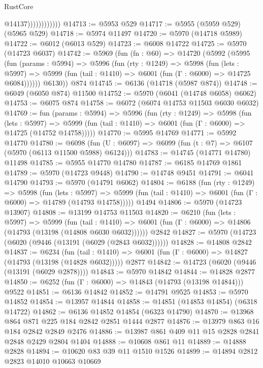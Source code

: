 \begin{lexlean}{RustCore}
\begin{coremodule}
{\begin{coremodule}
{{{{{{{{{{{{{{{{{{{{{{{{{{{{{{{{{{{{{{{{{{{{{                            @14137))))))))))))
@14713 := @5953 @529
@14717 := @5955 (@5959 @529) (@5965 @529)
@14718 := @5974 @11497
@14720 := @5970 (@14718 @5989)
@14722 := @6012 (@6013 @529)
@14723 := @6008 @14722
@14725 := @5970 (@14723 @6037)
@14742 := @5969
    (fun (fn : @60) =>
    @14720
      (@5992
        (@5995
          (fun (params : @5994) =>
          @5996
            (fun (rty : @1249) =>
            @5998
              (fun (lets : @5997) =>
              @5999 (fun (tail : @1410) => @6001 (fun (Γ : @6000) => @14725 @6084))))))
        @6130))
    @874
@14745 := @6136 (@14718 (@5987 @874))
@14748 := @6049 (@6050 @874) @11500
@14752 := @5970 (@6041 (@14748 @6058) @6062)
@14753 := @6075 @874
@14758 := @6072 (@6074 @14753 @11503 @6030 @6032)
@14769 := fun (params : @5994) =>
  @5996
    (fun (rty : @1249) =>
    @5998
      (fun (lets : @5997) =>
      @5999 (fun (tail : @1410) => @6001 (fun (Γ : @6000) => @14725 (@14752 @14758)))))
@14770 := @5995 @14769
@14771 := @5992 @14770
@14780 := @6098
    (fun (U : @6097) => @6099 (fun (t : @7) => @6107 (@5970 (@6113 @11500 @5988) @6124)))
@14783 := @14745 (@14771 @14780) @11498
@14785 := @5955 @14770 @14780
@14787 := @6185 @14769 @1861
@14789 := @5970 (@14723 @9448)
@14790 := @14748 @9451
@14791 := @6041 @14790
@14793 := @5970 (@14791 @6062)
@14804 := @6188
    (fun (rty : @1249) =>
    @5998
      (fun (lets : @5997) =>
      @5999 (fun (tail : @1410) => @6001 (fun (Γ : @6000) => @14789 (@14793 @14758)))))
    @1494
@14806 := @5970 (@14723 @13907)
@14808 := @13199 @14753 @11503
@14820 := @6210
    (fun (lets : @5997) =>
    @5999
      (fun (tail : @1410) =>
      @6001 (fun (Γ : @6000) => @14806 (@14793 (@13198 (@14808 @6030 @6032))))))
    @2842
@14827 := @5970 (@14723 (@6020 (@9446 (@13191 (@6029 (@2843 @6032))))))
@14828 := @14808 @2842
@14837 := @6234
    (fun (tail : @1410) => @6001 (fun (Γ : @6000) => @14827 (@14793 (@13198 (@14828 @6032)))))
    @2877
@14842 := @14723 (@6020 (@9446 (@13191 (@6029 @2878))))
@14843 := @5970 @14842
@14844 := @14828 @2877
@14850 := @6252 (fun (Γ : @6000) => @14843 (@14793 (@13198 @14844))) @9522
@14851 := @6136 @14842
@14852 := @14791 @9525
@14853 := @5970 @14852
@14854 := @13957 @14844
@14858 := @14851 (@14853 @14854) (@6318 @14722)
@14862 := @6136 @14852 @14854 (@6323 @14790)
@14870 := @13968 @864 @871 @225 @184 @2842 @2851 @1444 @2877
@14876 := @13979 @863 @16 @184 @2842 @2849 @2476
@14886 := @13987 @861 @409 @11 @15 @2828 @2841 @2848 @2429 @2804 @1404
@14888 := @10608 @861 @11
@14889 := @14888 @2828
@14894 := @10620 @83 @39 @11 @1510 @1526
@14899 := @14894 @2812 @2823 @14010 @10663 @10669
}}}}}}}}}}}}}}}}}}}}}}}}}}}}}}}}}}}}}}}}}}}}}
\end{coremodule}}
\end{coremodule}
\end{lexlean}
